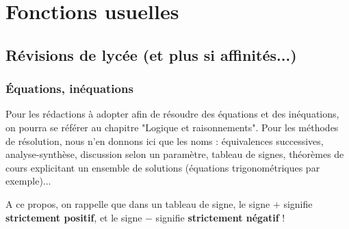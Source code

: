 \documentclass[french]{book}
\theoremstyle{plain}
\theoremstyle{definition}
\theoremstyle{remark}
\begin{document}
\newpage
\chapter{Fonctions usuelles}
\section{Révisions de lycée (et plus si affinités...)}
\subsection{Équations, inéquations}
Pour les rédactions à adopter afin de résoudre des équations et des inéquations, on pourra se référer au chapitre "Logique et raisonnements". Pour les méthodes de résolution, nous n'en donnons ici que les noms : équivalences successives, analyse-synthèse, discussion selon un paramètre, tableau de signes, théorèmes de cours explicitant un ensemble de solutions (équations trigonométriques par exemple)... \\ \par A ce propos, on rappelle que dans un tableau de signe, le signe $+$ signifie \textbf{strictement positif}, et le signe $-$ signifie \textbf{strictement négatif} !
\end{document}
